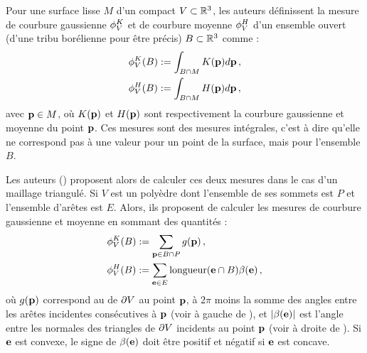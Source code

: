 Pour une surface lisse $M$ d'un compact $V \subset \mathbb{R}^3$, les auteurs
définissent la mesure de courbure gaussienne $\phi^{K}_V$ et de
courbure moyenne $\phi^{H}_V$ d'un ensemble ouvert (d'une tribu
borélienne pour être précis) $B \subset \mathbb{R}^3$ comme :
%
\begin{align}
  &\phi^{K}_V(B) := \int_{B \cap M} K(\mathbf{p}) d\mathbf{p} \,,\\
  &\phi^{H}_V(B)  := \int_{B \cap M} H(\mathbf{p})  d\mathbf{p} \,,
\end{align}
%
avec $\mathbf{p} \in M$, où $K(\mathbf{p})$ et $H(\mathbf{p})$ sont respectivement
la courbure gaussienne et moyenne du point $\mathbf{p}$. Ces mesures sont des mesures
intégrales, c'est à dire qu'elle ne correspond pas à une valeur pour un point de
la surface, mais pour l'ensemble $B$.


Les auteurs () proposent alors de calculer ces deux
mesures dans le cas d'un maillage triangulé. Si $V$ est un polyèdre dont
l'ensemble de ses sommets est $P$ et l'ensemble d'arêtes est $E$. Alors, ils
proposent de calculer les mesures de courbure gaussienne et moyenne en sommant
des quantités :
%
\begin{align}
  &\phi^{K}_V(B) := \sum_{\mathbf{p} \in B \cap P} g(\mathbf{p}) \,,\\
  &\phi^{H}_V(B)  := \sum_{\mathbf{e} \in E} \text{longueur}(\mathbf{e} \cap B) \beta(\mathbf{e}) \,,
\end{align}
%
où $g(\mathbf{p})$ correspond au  de $\partial V$ au point
$\mathbf{p}$, \cad à $2\pi$ moins la somme des angles entre les arêtes incidentes
consécutives à $\mathbf{p}$  (voir à gauche de ), et
$|\beta(\mathbf{e})|$ est l'angle entre les normales des triangles de $\partial V$
incidents au point $\mathbf{p}$ (voir à droite de ). Si
$\mathbf{e}$ est convexe, le signe de $\beta(\mathbf{e})$ doit être positif et négatif si
$\mathbf{e}$ est concave.


